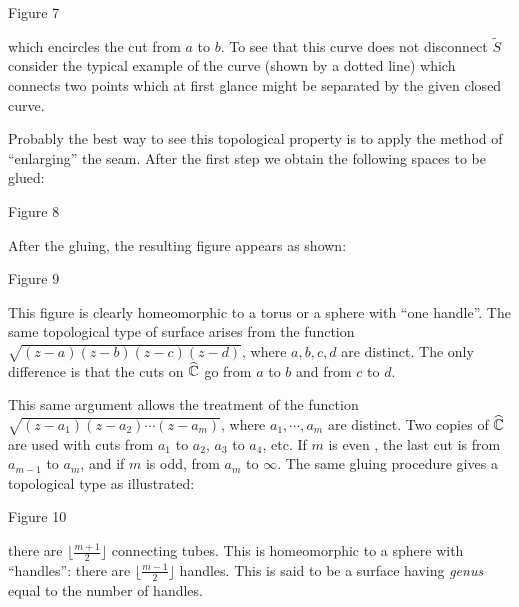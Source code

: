 \documentclass[a4paper,11pt]{article}
\begin{document}
\begin{mdframed}
  \vspace{3cm}

  Figure 7
\end{mdframed}

\noindent
which encircles the cut from $a$ to $b$.  To see that this curve does
not disconnect $\widetilde{S}$ consider the typical example of the
curve (shown by a dotted line) which connects two points which at
first glance might be separated by the given closed curve.

Probably the best way to see this topological property is to apply the
method of ``enlarging'' the seam.  After the first step we obtain the
following spaces to be glued:

\begin{mdframed}
  \vspace{3.5cm}

  Figure 8
\end{mdframed}

After the gluing, the resulting figure appears as shown:

\begin{mdframed}
  \vspace{3.5cm}

  Figure 9
\end{mdframed}

This figure is clearly homeomorphic to a torus or a sphere with ``one
handle''.  The same topological type of surface arises from the
function $\sqrt{(z-a)(z-b)(z-c)(z-d)}$, where $a,b,c,d$ are distinct.
The only difference is that the cuts on $\widehat{{\mathbb C}}$ go from $a$
to $b$ and from $c$ to $d$.

This same argument allows the treatment of the function
$\sqrt{(z-a_1)(z-a_2)\cdots(z-a_m)}$, where $a_1, \cdots, a_m$ are
distinct.  Two copies of $\widehat{{\mathbb C}}$ are used with cuts from
$a_1$ to $a_2$, $a_3$ to $a_4$, etc.  If $m$ is even , the last cut is
from $a_{m-1}$ to $a_m$, and if $m$ is odd, from $a_m$ to $\infty$.
The same gluing procedure gives a topological type as illustrated:

\begin{mdframed}
  \vspace{4cm}

  Figure 10
\end{mdframed}

\noindent
there are $\lfloor \frac{m+1}{2}\rfloor$ connecting tubes.  This is
homeomorphic to a sphere with ``handles'': there are $\lfloor
\frac{m-1}{2}\rfloor$ handles.  This is said to be a surface having
\emph{genus} equal to the number of handles.
\end{document}
